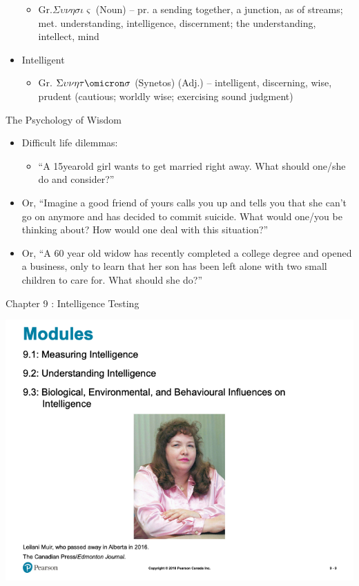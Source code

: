 \documentclass[
]{book}
\providecommand{\tightlist}{%
  \setlength{\itemsep}{0pt}\setlength{\parskip}{0pt}}
\begin{document}
\begin{reflect}
\begin{itemize}
  \begin{itemize}
  \tightlist
  \item
    Gr.\(\Sigma\upsilon\nu\eta\sigma\iota\varsigma\) (Noun) -- pr. a sending together, a junction, as of streams; met. understanding, intelligence, discernment; the understanding, intellect, mind\\
  \end{itemize}
\item
  Intelligent

  \begin{itemize}
  \tightlist
  \item
    Gr. \(\Sigma\upsilon\nu\eta\tau\omicron\sigma\) (Synetos) (Adj.) -- intelligent, discerning, wise, prudent (cautious; worldly wise; exercising sound judgment)
  \end{itemize}
\end{itemize}

The Psychology of Wisdom

\begin{itemize}
\tightlist
\item
  Difficult life dilemmas:

  \begin{itemize}
  \tightlist
  \item
    ``A 15yearold girl wants to get married right away. What should one/she do and consider?''
  \end{itemize}
\item
  Or, ``Imagine a good friend of yours calls you up and tells you that she can't go on anymore and has decided to commit suicide. What would one/you be thinking about? How would one deal with this situation?''\\
\item
  Or, ``A 60 year old widow has recently completed a college degree and opened a business, only to learn that her son has been left alone with two small children to care for. What should she do?''
\end{itemize}

Chapter 9 : Intelligence Testing

\includegraphics{assets/unit_2/slide_9.png}


\end{reflect}
\end{document}
